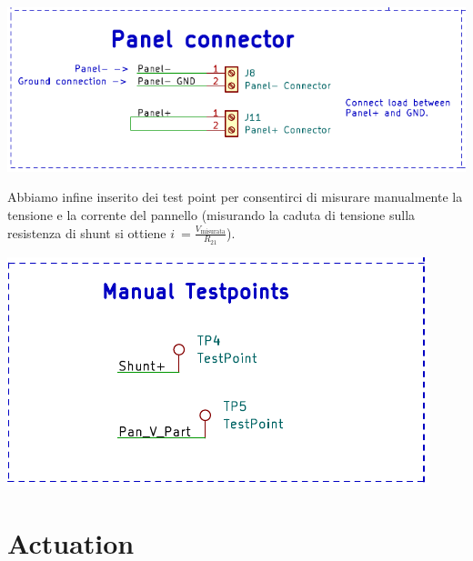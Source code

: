 \begin{center}
\includegraphics[scale=0.8]{figures/image48.png}
\captionsetup{type=figure}
\end{center}

\noindent Abbiamo infine inserito dei test point per consentirci di misurare
manualmente la tensione e la corrente del pannello (misurando la caduta
di tensione sulla resistenza di shunt si ottiene
\(i\  = \frac{V_{\text{misurata}}}{R_{21}}\)).

\begin{center}
\includegraphics[scale=0.8]{figures/image70.png}
\captionsetup{type=figure}
\end{center}

\hypertarget{actuation}{%
\section{Actuation}\label{actuation}}

